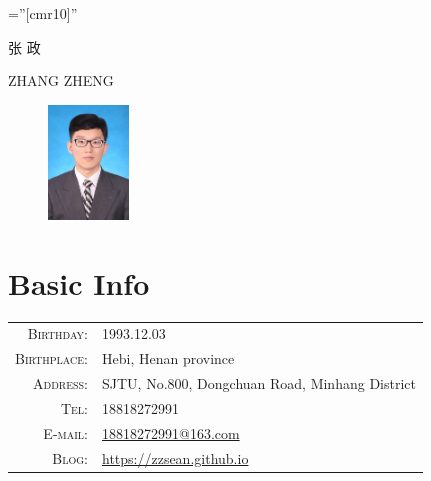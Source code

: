 \documentclass[a4paper,11pt]{article}
\begin{document}

\pagestyle{empty} %

\font\fb=''[cmr10]'' %

\par{
		\begin{center}{\Huge 张 \textsc{政}
	}\end{center}
\begin{center}{ZHANG \textsc{ZHENG}
	}\end{center}
\par}

\begin{figure} %
    \includegraphics[width=0.19\textwidth]{pic.jpg}
\end{figure}
\section{Basic Info}
\begin{tabular}{rl}
  \textsc{Birthday:} & 1993.12.03 \\
  \textsc{Birthplace:} & Hebi, Henan province \\
  \textsc{Address:}   &  SJTU, No.800, Dongchuan Road, Minhang District\\
  \textsc{Tel:}     & 18818272991\\
  \textsc{E-mail:}     & \href{mailto:18818272991@163.com}{18818272991@163.com}\\
  \textsc{Blog:}     & \href{https://zzsean.github.io}{https://zzsean.github.io}\\
\end{tabular}
\end{document}
